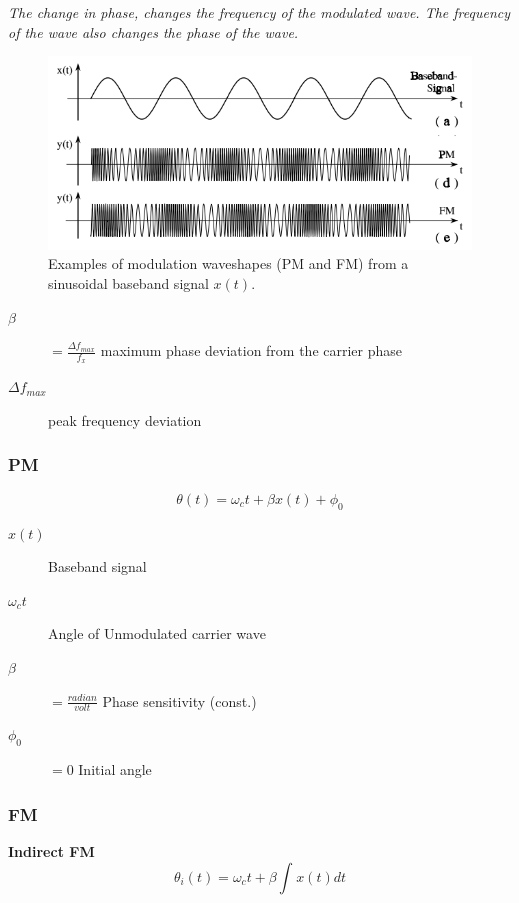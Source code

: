 \textit{The change in phase, changes the frequency of the modulated wave. The frequency of the wave also changes the phase of the wave.}

\begin{figure} [H]
	\centering
	\includegraphics[width=\linewidth]{graphics/8.png}
	\caption{Examples of modulation waveshapes (PM and FM) from a sinusoidal baseband signal $x(t)$.}
	\label{fig:8}
\end{figure}

\begin{description}
	\item[$\beta$] $=\frac{\Delta f_{max}}{f_x}$ maximum phase deviation from the carrier phase
	\item[$\Delta f_{max}$] peak frequency deviation
\end{description}

\subsubsection{PM}

\begin{equation}\label{eq:PM1}
\theta(t) =\omega_c t +\beta x(t)+\phi_0
\end{equation}

\begin{description}
	\item[$x(t)$] Baseband signal
	\item[$\omega_c t$] Angle of Unmodulated carrier wave
	\item[$\beta$]$=\frac{radian}{volt}$ Phase sensitivity (const.)
	\item[$\phi_0$] $=0$ Initial angle
\end{description}

\subsubsection{FM}
\textbf{Indirect FM}
\begin{equation}\label{eq:FM1}
\theta_i(t) =\omega_c t + \beta \int_{}^{} x(t) dt
\end{equation}

